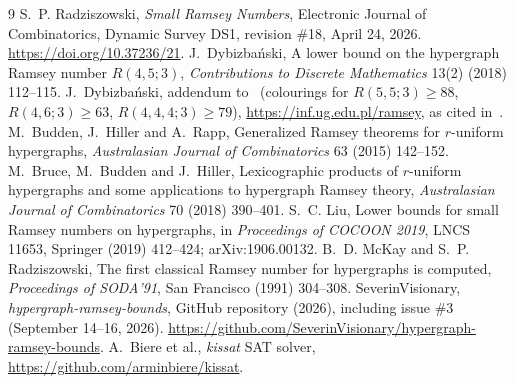 \documentclass[11pt]{article}
\theoremstyle{definition}
\theoremstyle{remark}
\begin{document}
\begin{thebibliography}{9}
 S.~P. Radziszowski, \emph{Small Ramsey Numbers}, Electronic Journal of Combinatorics,
 Dynamic Survey DS1, revision \#18, April 24, 2026. \url{https://doi.org/10.37236/21}.
 J.~Dybizbański, A lower bound on the hypergraph Ramsey number $R(4,5;3)$,
 \emph{Contributions to Discrete Mathematics} 13(2) (2018) 112--115.
 J.~Dybizbański, addendum to~\cite{Dyb2} (colourings for $R(5,5;3)\ge 88$, $R(4,6;3)\ge 63$,
 $R(4,4,4;3)\ge 79$), \url{https://inf.ug.edu.pl/ramsey}, as cited in~\cite{DS1}.
 M.~Budden, J.~Hiller and A.~Rapp, Generalized Ramsey theorems for $r$-uniform hypergraphs,
 \emph{Australasian Journal of Combinatorics} 63 (2015) 142--152.
 M.~Bruce, M.~Budden and J.~Hiller, Lexicographic products of $r$-uniform hypergraphs and some
 applications to hypergraph Ramsey theory, \emph{Australasian Journal of Combinatorics} 70 (2018) 390--401.
 S.~C. Liu, Lower bounds for small Ramsey numbers on hypergraphs, in \emph{Proceedings of COCOON 2019},
 LNCS 11653, Springer (2019) 412--424; arXiv:1906.00132.
 B.~D. McKay and S.~P. Radziszowski, The first classical Ramsey number for hypergraphs is computed,
 \emph{Proceedings of SODA'91}, San Francisco (1991) 304--308.
 SeverinVisionary, \emph{hypergraph-ramsey-bounds}, GitHub repository (2026), including issue \#3
 (September 14--16, 2026). \url{https://github.com/SeverinVisionary/hypergraph-ramsey-bounds}.
 A.~Biere et al., \emph{kissat} SAT solver, \url{https://github.com/arminbiere/kissat}.
\end{thebibliography}
\end{document}
